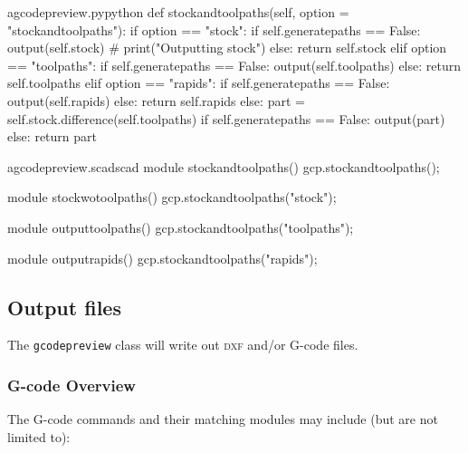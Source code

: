 \documentclass{ltxdoc}
\begin{document}
\lstset{firstnumber=\thegcpy}
\begin{writecode}{a}{gcodepreview.py}{python}
    def stockandtoolpaths(self, option = "stockandtoolpaths"):
        if option == "stock":
            if self.generatepaths == False:
                output(self.stock)
#                print("Outputting stock")
            else:
                return self.stock
        elif option == "toolpaths":
            if self.generatepaths == False:
                output(self.toolpaths)
            else:
                return self.toolpaths
        elif option == "rapids":
            if self.generatepaths == False:
                output(self.rapids)
            else:
                return self.rapids
        else:
            part = self.stock.difference(self.toolpaths)
            if self.generatepaths == False:
                output(part)
            else:
                return part
                    
\end{writecode}
\addtocounter{gcpy}{23}

\lstset{firstnumber=\thegcpscad}
\begin{writecode}{a}{gcodepreview.scad}{scad}
module stockandtoolpaths(){
    gcp.stockandtoolpaths();
}

module stockwotoolpaths(){
    gcp.stockandtoolpaths("stock");
}

module outputtoolpaths(){
    gcp.stockandtoolpaths("toolpaths");
}

module outputrapids(){
    gcp.stockandtoolpaths("rapids");
}

\end{writecode}
\addtocounter{gcpscad}{50}

\subsection{Output files}

The \verb|gcodepreview| class will write out \textsc{dxf} and/or G-code files.

\subsubsection{G-code Overview}
 
The G-code commands and their matching modules may include (but are not limited to):

\bigskip
\end{document}
